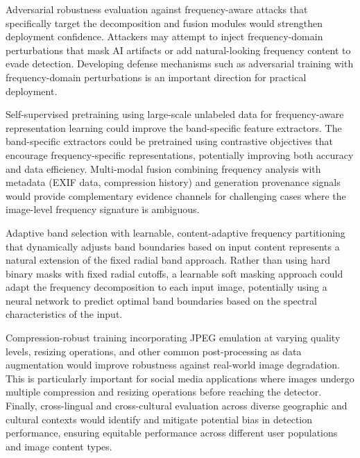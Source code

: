\documentclass[journal]{IEEEtran}
\begin{document}
Adversarial robustness evaluation against frequency-aware attacks that specifically target the decomposition and fusion modules would strengthen deployment confidence. Attackers may attempt to inject frequency-domain perturbations that mask AI artifacts or add natural-looking frequency content to evade detection. Developing defense mechanisms such as adversarial training with frequency-domain perturbations is an important direction for practical deployment.

Self-supervised pretraining using large-scale unlabeled data for frequency-aware representation learning could improve the band-specific feature extractors. The band-specific extractors could be pretrained using contrastive objectives that encourage frequency-specific representations, potentially improving both accuracy and data efficiency. Multi-modal fusion combining frequency analysis with metadata (EXIF data, compression history) and generation provenance signals would provide complementary evidence channels for challenging cases where the image-level frequency signature is ambiguous.

Adaptive band selection with learnable, content-adaptive frequency partitioning that dynamically adjusts band boundaries based on input content represents a natural extension of the fixed radial band approach. Rather than using hard binary masks with fixed radial cutoffs, a learnable soft masking approach could adapt the frequency decomposition to each input image, potentially using a neural network to predict optimal band boundaries based on the spectral characteristics of the input.

Compression-robust training incorporating JPEG emulation at varying quality levels, resizing operations, and other common post-processing as data augmentation would improve robustness against real-world image degradation. This is particularly important for social media applications where images undergo multiple compression and resizing operations before reaching the detector. Finally, cross-lingual and cross-cultural evaluation across diverse geographic and cultural contexts would identify and mitigate potential bias in detection performance, ensuring equitable performance across different user populations and image content types.
\end{document}
